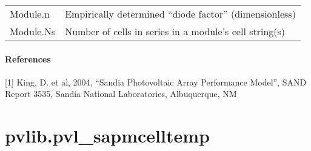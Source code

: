 \documentclass[letterpaper,10pt,english]{sphinxmanual}
\begin{document}
\begin{fulllineitems}
\begin{tabulary}{\linewidth}{|L|L|}
Module.n
 & 
Empirically determined ``diode factor'' (dimensionless)
\\

Module.Ns
 & 
Number of cells in series in a module's cell string(s)
\\
\hline\end{tabulary}

\paragraph{References}

{[}1{]} King, D. et al, 2004, ``Sandia Photovoltaic Array Performance Model'', SAND Report
3535, Sandia National Laboratories, Albuquerque, NM

\end{fulllineitems}



\section{pvlib.pvl\_sapmcelltemp}
\label{stubs/pvlib.pvl_sapmcelltemp:pvlib-pvl-sapmcelltemp}\label{stubs/pvlib.pvl_sapmcelltemp::doc}
\end{document}
